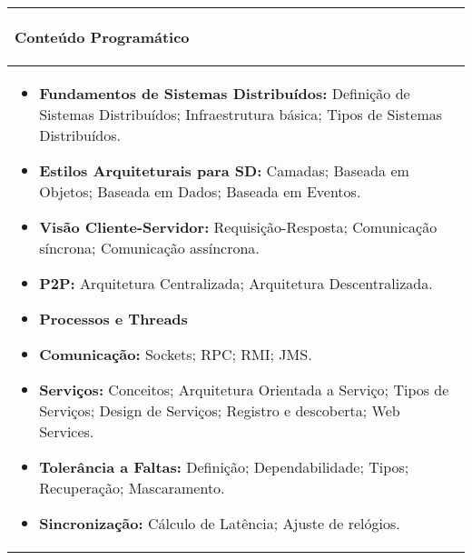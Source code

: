 \hspace{1cm}
\begin{table}[h!]
\centering
\begin{small} 
\setlength{\tabcolsep}{3pt} 
\begin{tabular}{|p{15cm}|}\hline

\begin{center}\textbf{Conteúdo Programático}\end{center}\\ \hline
\begin{itemize}
 \item \textbf{Fundamentos de Sistemas Distribuídos:} Definição de Sistemas Distribuídos; Infraestrutura básica; Tipos de Sistemas Distribuídos.

 \item \textbf{Estilos Arquiteturais para SD:} Camadas; Baseada em Objetos; Baseada em Dados; Baseada em Eventos.

 \item \textbf{Visão Cliente-Servidor:} Requisição-Resposta; Comunicação síncrona; Comunicação assíncrona.

 \item \textbf{P2P:} Arquitetura Centralizada; Arquitetura Descentralizada.
 \item \textbf{Processos e Threads}
 \item \textbf{Comunicação:} Sockets; RPC; RMI; JMS.

 \item \textbf{Serviços:} Conceitos; Arquitetura Orientada a Serviço; Tipos de Serviços; Design de Serviços; Registro e descoberta; Web Services.

 \item \textbf{Tolerância a Faltas:} Definição; Dependabilidade; Tipos; Recuperação; Mascaramento.
 \item \textbf{Sincronização:} Cálculo de Latência; Ajuste de relógios.
\end{itemize}
 \\ \hline

\end{tabular} 
\end{small}
\label{dadosinstituicao}
\end{table}


